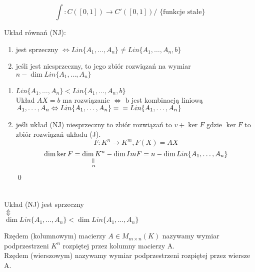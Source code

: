 \begin{prz}
    $$ \int: C([0,1]) \rightarrow C'([0,1]) \text{/ \{funkcje stałe\} }$$ 
\end{prz}

\begin{ft} 
    Układ równań (NJ): 
    \begin{enumerate}[{(}1{)}]
        \item jest sprzeczny $\Leftrightarrow Lin\{A_1,\dots,A_n\} \neq Lin\{A_1,\dots,A_n,b\}$ 
        \item jeśli jest niesprzeczny, to jego zbiór rozwiązań na wymiar $n - \dim Lin\{A_1,\dots,A_n\}$
    \end{enumerate}
\end{ft}

\begin{dd} \hfill
    \begin{enumerate}[{(}1{)}]
        \item $Lin\{A_1,\dots,A_n\} < Lin\{A_1,\dots,A_n,b\}$ \\
        Układ $AX = b$ ma rozwiązanie $\Leftrightarrow$ b jest kombinacją liniową $A_1,\dots,A_n \Leftrightarrow Lin\{A_1,\dots,A_n\} = \\ = Lin\{A_1,\dots,A_n\}$
        \item jeśli układ (NJ) niesprzeczny to zbiór rozwiązań to $v+ \ker F$ gdzie $\ker F$ to zbiór rozwiązań układu (J). 
        $$ F: K^n \rightarrow K^m,  F(X) = AX$$ 
        $$ \dim \ker F = \underscript{\dim K^n}{\verteq}{n} - \dim Im F = n - \dim Lin\{A_1,\dots,A_n\}$$ 
        \hfill \qed
    \end{enumerate}
\end{dd}

\begin{wn} ~\\
    Układ (NJ) jest sprzeczny \\
    \hspace*{20mm} $\Updownarrow$ \\
    $\dim Lin\{A_1,\dots,A_n\} < \dim Lin \{A_1,\dots,A_n\}$
\end{wn}

\begin{df}
    Rzędem (kolumnowym) macierzy $A \in M_{m \times n} (K) $ nazywamy wymiar podprzestrzeni $K^n$ rozpiętej przez kolumny macierzy A. \\ 
    Rzędem (wierszowym) nazywamy wymiar podprzestrzeni rozpiętej przez wiersze A. 
\end{df}

